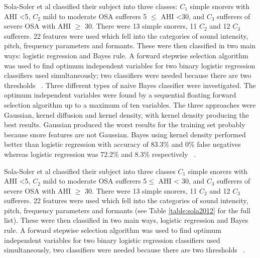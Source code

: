 Sola-Soler et al classified their subject into three classes: $C_{1}$ simple snorers with AHI \textless 5, $C_{2}$ mild to moderate OSA sufferers 5 $\leq$ AHI \textless 30, and $C_{3}$ sufferers of severe OSA with AHI $\geq$ 30. There were 13 simple snorers, 11 $C_{2}$ and 12 $C_{3}$ sufferers. 22 features were used which fell into the categories of sound intensity, pitch, frequency parameters and formants. These were then classified in two main ways: logistic regression and Bayes rule. A forward stepwise selection algorithm was used to find optimum independent variables for two binary logistic regression classifiers used simultaneously; two classifiers were needed because there are two thresholds ~\cite{sola2012multiclass}.
Three different types of naive Bayes classifier were investigated. The optimum independent variables were found by a sequential floating forward selection algorithm up to a maximum of ten variables. The three approaches were Gaussian, kernel diffusion and kernel density, with kernel density producing the best results. Gaussian produced the worst results for the training set probably because snore features are not Gaussian. Bayes using kernel density performed better than logistic regression with accuracy of 83.3\% and 0\% false negatives whereas logistic regression was 72.2\% and 8.3\% respectively ~\cite{sola2012multiclass}.

Sola-Soler et al classified their subject into three classes $C_{1}$ simple snorers with AHI <5, $C_{2}$ mild to moderate OSA sufferers 5$\leq$ AHI < 30, and $C_{3}$ sufferers of severe OSA with AHI $\geq$ 30. There were 13 simple snorers, 11 $C_{2}$ and 12 $C_{3}$ sufferers. 22 features were used which fell into the categories of sound intensity, pitch, frequency parameters and formants (see Table \ref{table:sola2012} for the full list). These were then classified in two main ways, logistic regression and Bayes rule. A forward stepwise selection algorithm was used to find optimum independent variables for two binary logistic regression classifiers used simultaneously, two classifiers were needed because there are two thresholds ~\cite{sola2012multiclass}.

